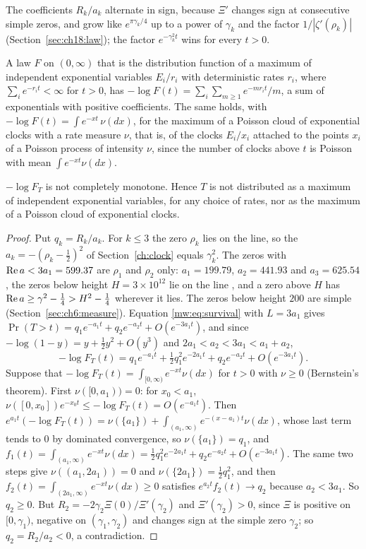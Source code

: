 The coefficients $R_k/a_k$ alternate in sign, because $\Xi'$ changes sign at consecutive simple zeros, and grow like $e^{\pi\gamma_k/4}$ up to a power of $\gamma_k$ and the factor $1/|\zeta'(\rho_k)|$ (Section~\ref{sec:ch18:law}); the factor $e^{-\gamma_k^2t}$ wins for every $t>0$.

A law $F$ on $(0,\infty)$ that is the distribution function of a maximum of independent exponential variables $E_i/r_i$ with deterministic rates $r_i$, where $\sum_ie^{-r_it}<\infty$ for $t>0$, has $-\log F(t)=\sum_i\sum_{m\ge1}e^{-mr_it}/m$, a sum of exponentials with positive coefficients. The same holds, with $-\log F(t)=\int e^{-xt}\,\nu(dx)$, for the maximum of a Poisson cloud of exponential clocks with a rate measure $\nu$, that is, of the clocks $E_i/x_i$ attached to the points $x_i$ of a Poisson process of intensity $\nu$, since the number of clocks above $t$ is Poisson with mean $\int e^{-xt}\nu(dx)$.

\begin{proposition}\label{mw:prop:nomax}
$-\log F_T$ is not completely monotone. Hence $T$ is not distributed as a maximum of independent exponential variables, for any choice of rates, nor as the maximum of a Poisson cloud of exponential clocks.
\end{proposition}

\begin{proof}
Put $q_k=R_k/a_k$. For $k\le3$ the zero $\rho_k$ lies on the line, so the $a_k=-(\rho_k-\frac12)^2$ of Section~\ref{ch:clock} equals $\gamma_k^2$. The zeros with $\operatorname{Re} a<3a_1=599.37$ are $\rho_1$ and $\rho_2$ only: $a_1=199.79$, $a_2=441.93$ and $a_3=625.54$, the zeros below height $H=3\times10^{12}$ lie on the line \cite{PT21}, and a zero above $H$ has $\operatorname{Re} a\ge\gamma^2-\frac14>H^2-\frac14$ wherever it lies. The zeros below height $200$ are simple (Section~\ref{sec:ch6:measure}). Equation \eqref{mw:eq:survival} with $L=3a_1$ gives $\Pr(T>t)=q_1e^{-a_1t}+q_2e^{-a_2t}+O(e^{-3a_1t})$, and since $-\log(1-y)=y+\frac12y^2+O(y^3)$ and $2a_1<a_2<3a_1<a_1+a_2$,
\[
-\log F_T(t)=q_1e^{-a_1t}+\tfrac12q_1^2e^{-2a_1t}+q_2e^{-a_2t}+O(e^{-3a_1t}).
\]
Suppose that $-\log F_T(t)=\int_{[0,\infty)}e^{-xt}\nu(dx)$ for $t>0$ with $\nu\ge0$ (Bernstein's theorem). First $\nu([0,a_1))=0$: for $x_0<a_1$, $\nu([0,x_0])e^{-x_0t}\le-\log F_T(t)=O(e^{-a_1t})$. Then $e^{a_1t}(-\log F_T(t))=\nu(\{a_1\})+\int_{(a_1,\infty)}e^{-(x-a_1)t}\nu(dx)$, whose last term tends to $0$ by dominated convergence, so $\nu(\{a_1\})=q_1$, and $f_1(t)=\int_{(a_1,\infty)}e^{-xt}\nu(dx)=\frac12q_1^2e^{-2a_1t}+q_2e^{-a_2t}+O(e^{-3a_1t})$. The same two steps give $\nu((a_1,2a_1))=0$ and $\nu(\{2a_1\})=\frac12q_1^2$, and then $f_2(t)=\int_{(2a_1,\infty)}e^{-xt}\nu(dx)\ge0$ satisfies $e^{a_2t}f_2(t)\to q_2$ because $a_2<3a_1$. So $q_2\ge0$. But $R_2=-2\gamma_2\Xi(0)/\Xi'(\gamma_2)$ and $\Xi'(\gamma_2)>0$, since $\Xi$ is positive on $[0,\gamma_1)$, negative on $(\gamma_1,\gamma_2)$ and changes sign at the simple zero $\gamma_2$; so $q_2=R_2/a_2<0$, a contradiction.
\end{proof}

